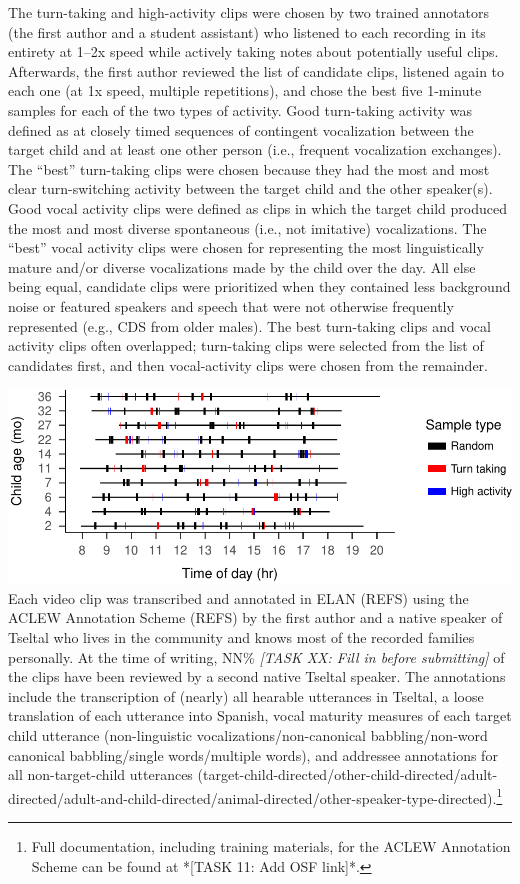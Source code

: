 \documentclass[floatsintext,man]{apa6}
\theoremstyle{definition}
\theoremstyle{definition}
\theoremstyle{definition}
\theoremstyle{remark}
\begin{document}
The turn-taking and high-activity clips were chosen by two trained
annotators (the first author and a student assistant) who listened to
each recording in its entirety at 1--2x speed while actively taking
notes about potentially useful clips. Afterwards, the first author
reviewed the list of candidate clips, listened again to each one (at 1x
speed, multiple repetitions), and chose the best five 1-minute samples
for each of the two types of activity. Good turn-taking activity was
defined as at closely timed sequences of contingent vocalization between
the target child and at least one other person (i.e., frequent
vocalization exchanges). The \enquote{best} turn-taking clips were
chosen because they had the most and most clear turn-switching activity
between the target child and the other speaker(s). Good vocal activity
clips were defined as clips in which the target child produced the most
and most diverse spontaneous (i.e., not imitative) vocalizations. The
\enquote{best} vocal activity clips were chosen for representing the
most linguistically mature and/or diverse vocalizations made by the
child over the day. All else being equal, candidate clips were
prioritized when they contained less background noise or featured
speakers and speech that were not otherwise frequently represented
(e.g., CDS from older males). The best turn-taking clips and vocal
activity clips often overlapped; turn-taking clips were selected from
the list of candidates first, and then vocal-activity clips were chosen
from the remainder.

\includegraphics{Tseltal-CLE_files/figure-latex/fig0-1.pdf} Each video
clip was transcribed and annotated in ELAN (REFS) using the ACLEW
Annotation Scheme (REFS) by the first author and a native speaker of
Tseltal who lives in the community and knows most of the recorded
families personally. At the time of writing, NN\% \emph{{[}TASK XX: Fill
in before submitting{]}} of the clips have been reviewed by a second
native Tseltal speaker. The annotations include the transcription of
(nearly) all hearable utterances in Tseltal, a loose translation of each
utterance into Spanish, vocal maturity measures of each target child
utterance (non-linguistic vocalizations/non-canonical babbling/non-word
canonical babbling/single words/multiple words), and addressee
annotations for all non-target-child utterances
(target-child-directed/other-child-directed/adult-directed/adult-and-child-directed/animal-directed/other-speaker-type-directed).\footnote{Full documentation, including training materials, for the ACLEW Annotation Scheme can be found at *[TASK 11: Add OSF link]*.}
\end{document}

